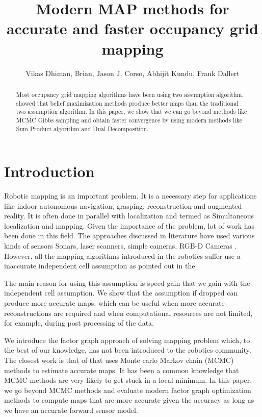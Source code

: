 \documentclass[letterpaper, 10 pt, conference]{ieeeconf} %
\title{Modern MAP methods for accurate and faster occupancy grid mapping}
\author{Vikas Dhiman, Brian, Jason J. Corso, Abhijit Kundu, Frank Dallert}
\begin{document}
\maketitle
\begin{abstract}
  Most occupancy grid mapping algorithms have been using two assumption
  algorithm.  \cite{merali2013icra} showed that belief maximization methods
  produce better maps than the traditional two assumption algorithm.  In this
  paper, we show that we can go beyond methods like MCMC Gibbs sampling and
  obtain faster convergence by using modern methods like Sum Product algorithm
  and Dual Decomposition.
\end{abstract}
\section{Introduction}
Robotic mapping is an important problem. It is a necessary step for applications like indoor autonomous navigation, grasping, reconstruction and augmented reality. It is often done in parallel with localization and termed as Simultaneous localization and mapping. Given the importance of the problem, lot of work has been done in this field. The approaches discussed in literature have used various kinds of sensors 
Sonars,%
laser scanners, %
simple cameras, %
RGB-D Cameras \cite{newcombe2011kinectfusion, whelan2013robust, whelan2012kintinuous}. 
However, all the mapping algorithms introduced in the robotics suffer use a inaccurate independent cell assumption as pointed out in the %

The main reason for using this assumption is speed gain that we gain with the independent cell assumption. We show that the assumption if dropped can produce more accurate maps, which can be useful when more accurate reconstructions are required and when computational resources are not limited, for example, during post processing of the data.

We introduce the factor graph approach of solving mapping problem which, to the best of our knowledge, has not been introduced to the robotics community. The closest work is that of \cite{merali2013icra} that uses Monte carlo Markov chain (MCMC) methods to estimate accurate maps. It has been a common knowledge that MCMC methods are very likely to get stuck in a local minimum. In this paper, we go beyond MCMC methods and evaluate modern factor graph optimization methods to compute maps that are more accurate given the accuracy as long as we have an accurate forward sensor model.
\end{document}

